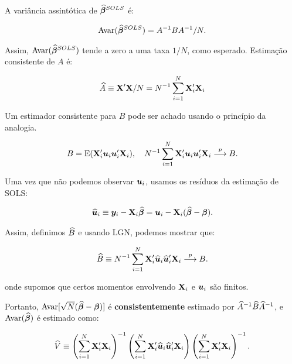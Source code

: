 \documentclass[11pt, oneside, a4paper, article]{article}
\numberwithin{equation}{section}
\begin{document}
A variância assintótica de $\widehat{\boldsymbol{\beta}}^{SOLS}$ é:

\vspace{-1 em}
\begin{align}\label{eq:avar:sols}
	\text{Avar}(\widehat{\boldsymbol{\beta}}^{SOLS}) = A^{-1} B A^{-1}/N.
\end{align}

Assim, $\text{Avar}(\widehat{\boldsymbol{\beta}}^{SOLS})$ tende a zero a uma taxa $1/N$, como esperado.
Estimação consistente de $A$ é:

\vspace{-1 em}
\begin{align*}
	\widehat{A} \equiv \mathbf{X}'\mathbf{X}/N = N^{-1} \sum_{i=1}^{N} \mathbf{X}_{i}'\mathbf{X}_{i}
\end{align*}

Um estimador consistente para $B$ pode ser achado usando o princípio da analogia.

\vspace{-1 em}
\begin{align*}
B = \text{E}(\mathbf{X}_{i}' \boldsymbol{u}_{i} \boldsymbol{u}_{i}' \mathbf{X}_{i}), 
\quad
N^{-1}\sum_{i=1}^{N} \mathbf{X}_{i}' \boldsymbol{u}_{i} \boldsymbol{u}_{i}' \mathbf{X}_{i}  \overset{p}{\longrightarrow}  B.
\end{align*}

Uma vez que não podemos observar $\boldsymbol{u}_{i}$, usamos os resíduos da estimação de SOLS:

\vspace{-1 em}
\begin{align*}
\widehat{\boldsymbol{u}}_{i} \equiv \boldsymbol{y}_{i} - \mathbf{X}_{i} \widehat{\boldsymbol{\beta}} 
=
\boldsymbol{u}_{i} - \mathbf{X}_{i} (\widehat{\boldsymbol{\beta}} - \boldsymbol{\beta}).
\end{align*}

Assim, definimos $\widehat{B}$ e usando LGN, podemos mostrar que:

\vspace{-1 em}
\begin{align*}
\widehat{B} \equiv N^{-1}\sum_{i=1}^{N} \mathbf{X}_{i}' \widehat{\boldsymbol{u}}_{i} \widehat{\boldsymbol{u}}_{i}' \mathbf{X}_{i} 
 \overset{p}{\longrightarrow}  B.
\end{align*}

\noindent
onde supomos que certos momentos envolvendo $\mathbf{X}_{i}$ e $\boldsymbol{u}_{i}$ são finitos.

Portanto, $\text{Avar}[\sqrt{N}(\widehat{\boldsymbol{\beta}} - \boldsymbol{\beta})]$ é \textbf{consistentemente} estimado por $\widehat{A}^{-1} \widehat{B} \widehat{A}^{-1}$, e $\text{Avar}(\widehat{\boldsymbol{\beta}})$ é estimado como:

\vspace{-1 em}
\begin{align*}
\widehat{V} \equiv 
\left( \sum_{i=1}^{N} \mathbf{X}_{i}' \mathbf{X}_{i}  \right)^{-1}
\left( \sum_{i=1}^{N} \mathbf{X}_{i}' \widehat{\boldsymbol{u}}_{i} \widehat{\boldsymbol{u}}_{i}'  \mathbf{X}_{i}  \right)
\left( \sum_{i=1}^{N} \mathbf{X}_{i}' \mathbf{X}_{i}  \right)^{-1}.
\end{align*}
\end{document}
